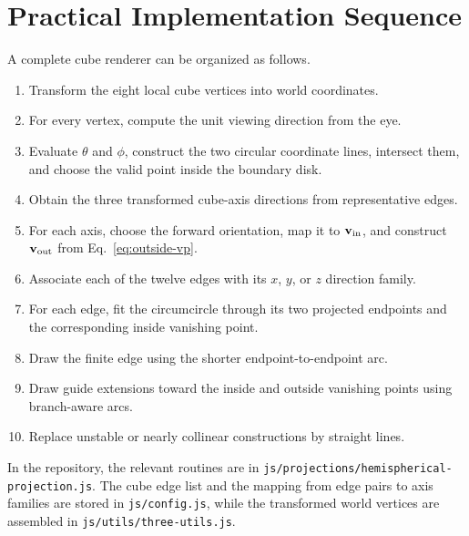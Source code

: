 \section{Practical Implementation Sequence}
A complete cube renderer can be organized as follows.
\begin{enumerate}
  \item Transform the eight local cube vertices into world coordinates.
  \item For every vertex, compute the unit viewing direction from the eye.
  \item Evaluate $\theta$ and $\phi$, construct the two circular coordinate lines, intersect them, and choose the valid point inside the boundary disk.
  \item Obtain the three transformed cube-axis directions from representative edges.
  \item For each axis, choose the forward orientation, map it to $\vb v_{\rm in}$, and construct $\vb v_{\rm out}$ from Eq.~\eqref{eq:outside-vp}.
  \item Associate each of the twelve edges with its $x$, $y$, or $z$ direction family.
  \item For each edge, fit the circumcircle through its two projected endpoints and the corresponding inside vanishing point.
  \item Draw the finite edge using the shorter endpoint-to-endpoint arc.
  \item Draw guide extensions toward the inside and outside vanishing points using branch-aware arcs.
  \item Replace unstable or nearly collinear constructions by straight lines.
\end{enumerate}

In the repository, the relevant routines are in \texttt{js/projections/hemispherical-projection.js}.  The cube edge list and the mapping from edge pairs to axis families are stored in \texttt{js/config.js}, while the transformed world vertices are assembled in \texttt{js/utils/three-utils.js}.


